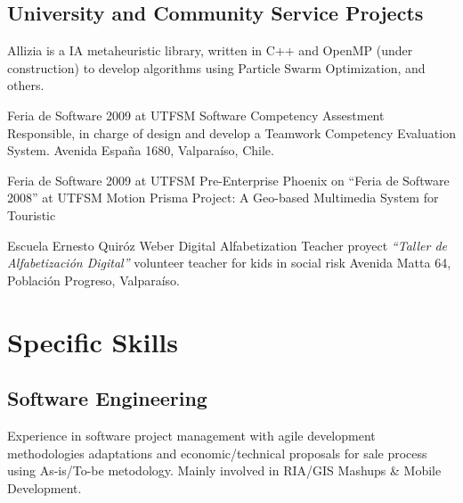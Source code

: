 \documentclass[11pt,letterpaper,roman]{moderncv}
\begin{document}
	

	
	
\subsection{University and Community Service Projects}


	
		{Allizia is a IA metaheuristic library, written in C++ and OpenMP (under
	construction) to develop algorithms using Particle Swarm Optimization, and
	others.}
	


		
	 {Feria de Software 2009 at \textsc{UTFSM}}
{} {}
		{Software Competency Assestment Responsible, in charge of design
		and develop a Teamwork Competency Evaluation System. Avenida Espa\~na 1680,
		Valpara\'iso, Chile.}

	 {\sd} {Feria de Software 2009 at \textsc{UTFSM}}
{} {}
		{Pre-Enterprise Phoenix on ``Feria de Software 2008'' at \textsc{UTFSM}
		Motion Prisma Project: A Geo-based Multimedia System for Touristic}
	
%

	{Escuela Ernesto Quir\'oz Weber}
	{Digital Alfabetization Teacher}
	{proyect \textit{``Taller de Alfabetizaci\'on Digital''}}
	{volunteer teacher for kids in social risk}
	{Avenida Matta 64, Poblaci\'on Progreso, Valpara\'iso.}
 

\section{Specific Skills}
\subsection{Software Engineering}
	{Experience in software project management with agile development
methodologies adaptations and economic/technical proposals for sale process
using As-is/To-be metodology. Mainly involved in RIA/GIS Mashups \& Mobile Development.}
	
\end{document}
